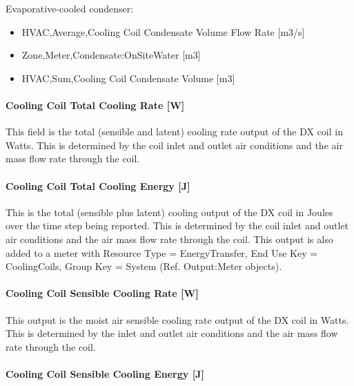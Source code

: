 Evaporative-cooled condenser:

\begin{itemize}
\item
  HVAC,Average,Cooling Coil Condensate Volume Flow Rate {[}m3/s{]}
\item
  Zone,Meter,Condensate:OnSiteWater {[}m3{]}
\item
  HVAC,Sum,Cooling Coil Condensate Volume {[}m3{]}
\end{itemize}

\paragraph{Cooling Coil Total Cooling Rate {[}W{]}}\label{cooling-coil-total-cooling-rate-w-1}

This field is the total (sensible and latent) cooling rate output of the DX coil in Watts. This is determined by the coil inlet and outlet air conditions and the air mass flow rate through the coil.

\paragraph{Cooling Coil Total Cooling Energy {[}J{]}}\label{cooling-coil-total-cooling-energy-j-1}

This is the total (sensible plus latent) cooling output of the DX coil in Joules over the time step being reported. This is determined by the coil inlet and outlet air conditions and the air mass flow rate through the coil. This output is also added to a meter with Resource Type = EnergyTransfer, End Use Key = CoolingCoils, Group Key = System (Ref. Output:Meter objects).

\paragraph{Cooling Coil Sensible Cooling Rate {[}W{]}}\label{cooling-coil-sensible-cooling-rate-w-1}

This output is the moist air sensible cooling rate output of the DX coil in Watts. This is determined by the inlet and outlet air conditions and the air mass flow rate through the coil.

\paragraph{Cooling Coil Sensible Cooling Energy {[}J{]}}\label{cooling-coil-sensible-cooling-energy-j-1}

